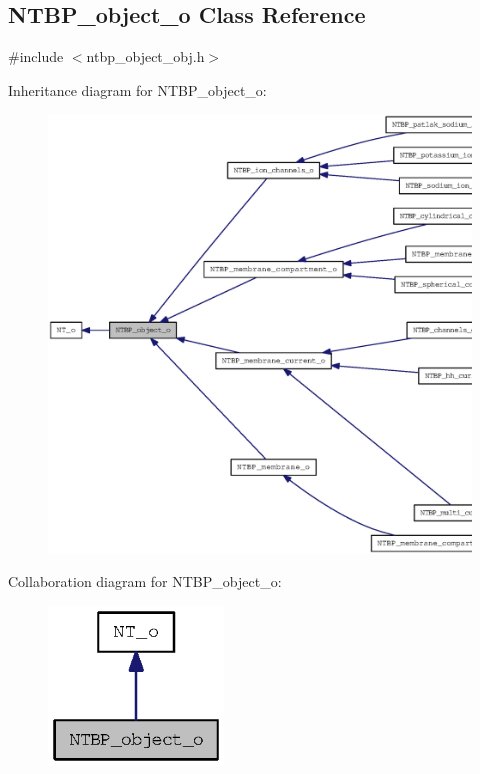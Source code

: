 \subsection{NTBP\_\-object\_\-o Class Reference}
\label{class_n_t_b_p__object__o}


{\ttfamily \#include $<$ntbp\_\-object\_\-obj.h$>$}



Inheritance diagram for NTBP\_\-object\_\-o:
\nopagebreak
\begin{figure}[H]
\begin{center}
\leavevmode
\includegraphics[width=400pt]{class_n_t_b_p__object__o__inherit__graph}
\end{center}
\end{figure}


Collaboration diagram for NTBP\_\-object\_\-o:
\nopagebreak
\begin{figure}[H]
\begin{center}
\leavevmode
\includegraphics[width=132pt]{class_n_t_b_p__object__o__coll__graph}
\end{center}
\end{figure}
